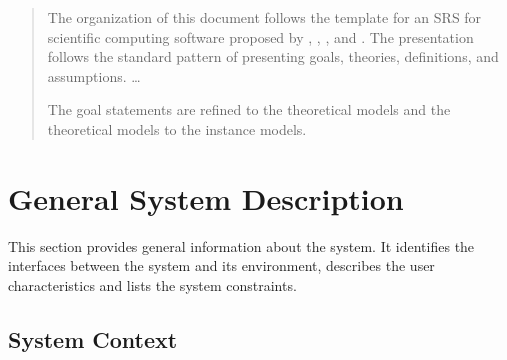 \documentclass[12pt]{article}
\begin{document}
\begin{quote}
The organization of this document follows the template for an SRS for scientific 
computing software proposed by \cite{koothoor2013}, \cite{smithLai2005}, 
\cite{smithEtAl2007}, and \cite{smithKoothoor2016}. The presentation follows 
the standard pattern of presenting goals, theories, definitions, and assumptions.
\dots


The goal statements are refined to the theoretical models and the theoretical 
models to the instance models.
\end{quote}

\section{General System Description}

This section provides general information about the system.  It identifies the
interfaces between the system and its environment, describes the user
characteristics and lists the system constraints.


\subsection{System Context}
\end{document}
